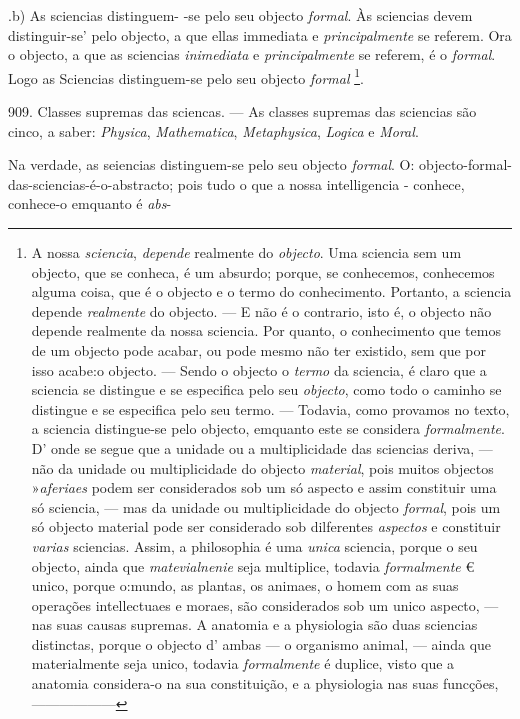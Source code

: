 .b) As sciencias distinguem- -se pelo seu objecto \emph{formal}. Às sciencias devem distinguir-se' pelo objecto, a que ellas immediata e \emph{principalmente} se referem. Ora o objecto, a que as sciencias \emph{inimediata} e \emph{principalmente} se referem, é o \emph{formal}. Logo as Sciencias distinguem-se pelo seu objecto \emph{formal} \footnote{A nossa \emph{sciencia}, \emph{depende} realmente do \emph{objecto}. Uma sciencia sem um objecto, que se conheca, é um absurdo; porque, se conhecemos, conhecemos alguma coisa, que é o objecto e o termo do conhecimento. Portanto, a sciencia depende \emph{realmente} do objecto. --- E não é o contrario, isto é, o objecto não depende realmente da nossa sciencia. Por quanto, o conhecimento que temos de um objecto pode acabar, ou pode mesmo não ter existido, sem que por isso acabe:o objecto. --- Sendo o objecto o \emph{termo} da sciencia, é claro que a sciencia se distingue e se especifica pelo seu \emph{objecto}, como todo o caminho se distingue e se especifica pelo seu termo. --- Todavia, como provamos no texto, a sciencia distingue-se pelo objecto, emquanto este se considera \emph{formalmente}. D' onde se segue que a unidade ou a multiplicidade das sciencias deriva, --- não da unidade ou multiplicidade do objecto \emph{material}, pois muitos objectos »\emph{aferiaes} podem ser considerados sob um só aspecto e assim constituir uma só sciencia, --- mas da unidade ou multiplicidade do objecto \emph{formal}, pois um só objecto material pode ser considerado sob dilferentes \emph{aspectos} e constituir \emph{varias} sciencias. Assim, a philosophia é uma \emph{unica} sciencia, porque o seu objecto, ainda que \emph{matevialnenie} seja multiplice, todavia \emph{formalmente} € unico, porque o:mundo, as plantas, os animaes, o homem com as suas operações intellectuaes e moraes, são considerados sob um unico aspecto, --- nas suas causas supremas. A anatomia e a physiologia são duas sciencias distinctas, porque o objecto d' ambas --- o organismo animal, --- ainda que materialmente seja unico, todavia \emph{formalmente} é duplice, visto que a anatomia considera-o na sua constituição, e a physiologia nas suas funcções,------------------}.

909. Classes supremas das sciencas. --- As classes supremas das sciencias são cinco, a saber: \emph{Physica}, \emph{Mathematica}, \emph{Metaphysica}, \emph{Logica} e \emph{Moral}.

Na verdade, as seiencias distinguem-se pelo seu objecto \emph{formal}. O: objecto-formal-das-sciencias-é-o-abstracto; pois tudo o que a nossa intelligencia - conhece, conhece-o emquanto é \emph{abs}-

